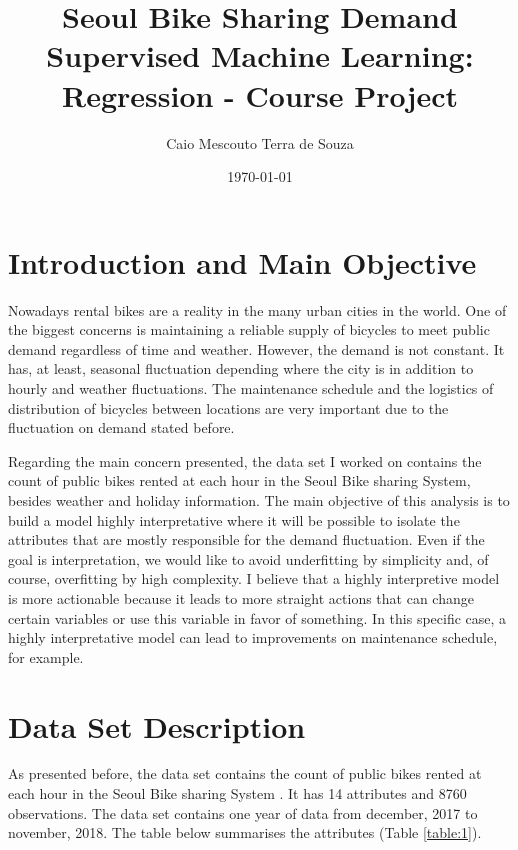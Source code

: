 \documentclass[11pt, a4]{article}
\title{Seoul Bike Sharing Demand \\
		\large Supervised Machine Learning: Regression - Course Project}
\author{Caio Mescouto Terra de Souza}
\date{\today}
\begin{document}
\maketitle

\section*{Introduction and Main Objective}

Nowadays rental bikes are a reality in the many urban cities in the world. One of the biggest concerns is maintaining a reliable supply of bicycles to meet public demand regardless of time and weather. However, the demand is not constant. It has, at least, seasonal fluctuation depending where the city is in addition to hourly and weather fluctuations. The maintenance schedule and the logistics of distribution of bicycles between locations are very important due to the fluctuation on demand stated before.

Regarding the main concern presented, the data set I worked on contains the count of public bikes rented at each hour in the Seoul Bike sharing System, besides weather and holiday information. The main objective of this analysis is to build a model highly interpretative where it will be possible to isolate the attributes that are mostly responsible for the demand fluctuation. Even if the goal is interpretation, we would like to avoid underfitting by simplicity and, of course, overfitting by high complexity. I believe that a highly interpretive model is more actionable because it leads to more straight actions that can change certain variables or use this variable in favor of something. In this specific case, a highly interpretative model can lead to improvements on maintenance schedule, for example.

\section*{Data Set Description}

As presented before, the data set contains the count of public bikes rented at each hour in the Seoul Bike sharing System \cite{bike}. It has 14 attributes and 8760 observations. The data set contains one year of data from december, 2017 to november, 2018. The table below summarises the attributes (Table  \ref{table:1}).
 
\end{document}
